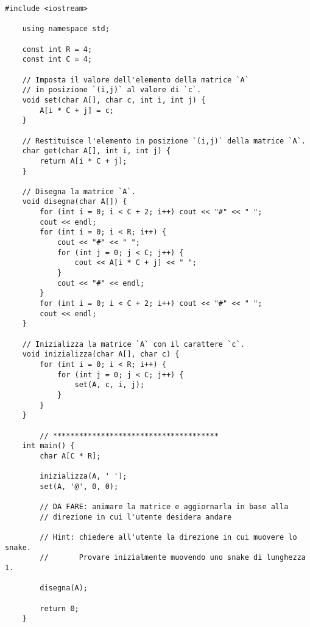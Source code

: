 \documentclass[addpoints,12pt,answers]{exam}
\begin{document}
    \begin{lstlisting}[style=mycpp]
	#include <iostream>
		
	using namespace std;
		
	const int R = 4;
	const int C = 4;
		
	// Imposta il valore dell'elemento della matrice `A`
	// in posizione `(i,j)` al valore di `c`.
	void set(char A[], char c, int i, int j) {
	    A[i * C + j] = c;
	}
		
	// Restituisce l'elemento in posizione `(i,j)` della matrice `A`.
	char get(char A[], int i, int j) {
	    return A[i * C + j];
	}
		
	// Disegna la matrice `A`.
	void disegna(char A[]) {
	    for (int i = 0; i < C + 2; i++) cout << "#" << " "; 
	    cout << endl;
	    for (int i = 0; i < R; i++) {
	        cout << "#" << " ";
	        for (int j = 0; j < C; j++) {
	            cout << A[i * C + j] << " ";
	        }
	        cout << "#" << endl;
	    }
	    for (int i = 0; i < C + 2; i++) cout << "#" << " ";
	    cout << endl;
	}
		
	// Inizializza la matrice `A` con il carattere `c`.
	void inizializza(char A[], char c) {
	    for (int i = 0; i < R; i++) {
	        for (int j = 0; j < C; j++) {
	            set(A, c, i, j);
	        }
	    }
	}

	    // **************************************
	int main() {
	    char A[C * R];
		
	    inizializza(A, ' ');
	    set(A, '@', 0, 0);
		
	    // DA FARE: animare la matrice e aggiornarla in base alla
	    // direzione in cui l'utente desidera andare
		
	    // Hint: chiedere all'utente la direzione in cui muovere lo snake.
	    //       Provare inizialmente muovendo uno snake di lunghezza 1.
		
	    disegna(A);
		
	    return 0;
	}
    
    \end{lstlisting}
    
\end{document}
